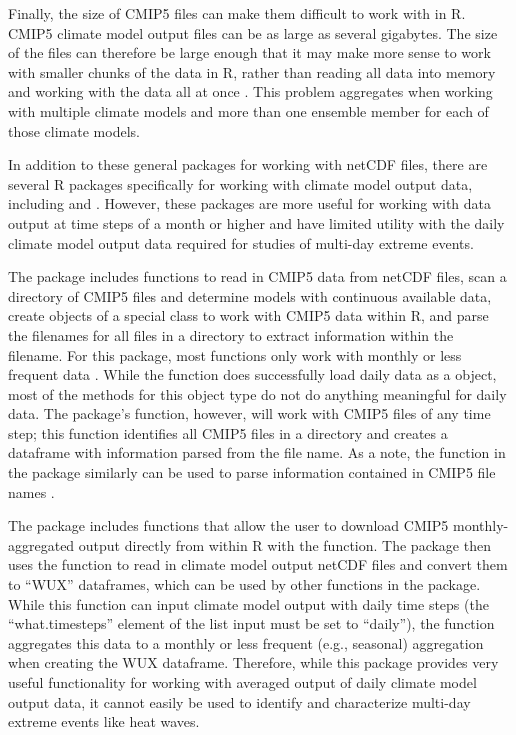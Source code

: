Finally, the size of CMIP5 files can make them difficult to work with in
R. CMIP5 climate model output files can be as large as several
gigabytes. The size of the files can therefore be large enough that it
may make more sense to work with smaller chunks of the data in R, rather
than reading all data into memory and working with the data all at once
\citep{RCMIP5}. This problem aggregates when working with multiple
climate models and more than one ensemble member for each of those
climate models.

In addition to these general packages for working with netCDF files,
there are several R packages specifically for working with climate model
output data, including  \citep{RCMIP5} and 
\citep{wux}. However, these packages are more useful for working with
data output at time steps of a month or higher and have limited utility
with the daily climate model output data required for studies of
multi-day extreme events.

The  package includes functions to read in CMIP5 data from
netCDF files, scan a directory of CMIP5 files and determine models with
continuous available data, create objects of a special 
class to work with CMIP5 data within R, and parse the filenames for all
files in a directory to extract information within the filename. For
this package, most functions only work with monthly or less frequent
data \citep{RCMIP5}. While the  function does
successfully load daily data as a  object, most of the
methods for this object type do not do anything meaningful for daily
data. The package's  function, however, will work with
CMIP5 files of any time step; this function identifies all CMIP5 files
in a directory and creates a dataframe with information parsed from the
file name. As a note, the  function in
the  package similarly can be used to parse
information contained in CMIP5 file names \citep{ncdf4.helpers}.

The  package \citep{wux} includes functions that allow the user
to download CMIP5 monthly-aggregated output directly from within R with
the  function. The package then uses the
 function to read in climate model output netCDF files
and convert them to ``WUX'' dataframes, which can be used by other
functions in the package. While this function can input climate model
output with daily time steps (the ``what.timesteps'' element of the
 list input must be set to ``daily''), the function
aggregates this data to a monthly or less frequent (e.g., seasonal)
aggregation when creating the WUX dataframe. Therefore, while this
package provides very useful functionality for working with averaged
output of daily climate model output data, it cannot easily be used to
identify and characterize multi-day extreme events like heat waves.

